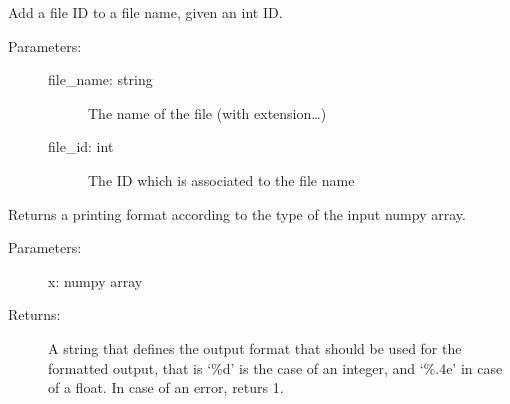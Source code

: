 \documentclass[letterpaper,10pt,english]{sphinxmanual}
\begin{document}
\begin{fulllineitems}
\label{\detokenize{appendices:s2Dcd.utili.add_file_id}}
Add a file ID to a file name, given an int ID.
\begin{description}
\item[{Parameters:}] \leavevmode\begin{description}
\item[{file\_name: string}] \leavevmode
The name of the file (with extension…)

\item[{file\_id: int}] \leavevmode
The ID which is associated to the file name

\end{description}

\end{description}

\end{fulllineitems}


\begin{fulllineitems}
\label{\detokenize{appendices:s2Dcd.utili.dtype_fmt}}
Returns a printing format according to the type of the input numpy
array.
\begin{description}
\item[{Parameters:}] \leavevmode
x: numpy array

\item[{Returns:}] \leavevmode
A string that defines the output format that should be used for the
formatted output, that is ‘\%d’ is the case of an integer, and
‘\%.4e’ in case of a float.
In case of an error, returs \sphinxhyphen{}1.

\end{description}

\end{fulllineitems}

\end{document}
